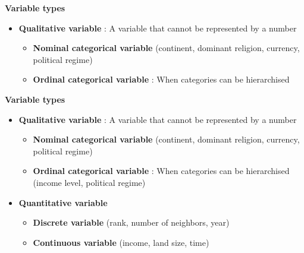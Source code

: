 \documentclass{beamer}
\begin{document}
\begin{frame}
    \textbf{Variable types}
    \vspace{0.2cm}
    \begin{itemize}
        \item \textbf{Qualitative variable} : A variable that cannot be represented by a number
        \begin{itemize}
            \item \textbf{Nominal categorical variable} (continent, dominant religion, currency, political regime)
            \item \textbf{Ordinal categorical variable} : When categories can be hierarchised
        \end{itemize}
    \end{itemize}
\end{frame}

\begin{frame}
    \textbf{Variable types}
    \vspace{0.2cm}
    \begin{itemize}
        \item \textbf{Qualitative variable} : A variable that cannot be represented by a number
        \begin{itemize}
            \item \textbf{Nominal categorical variable} (continent, dominant religion, currency, political regime)
            \item \textbf{Ordinal categorical variable} : When categories can be hierarchised (income level, political regime)
        \end{itemize}
        \vspace{0.2cm}
        \item \textbf{Quantitative variable}
        \begin{itemize}
            \item \textbf{Discrete variable} (rank, number of neighbors, year)
            \item \textbf{Continuous variable} (income, land size, time)
        \end{itemize}
    \end{itemize}
\end{frame}
\end{document}
